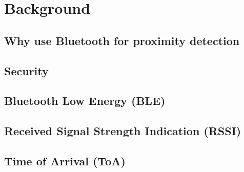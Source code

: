 \section{Background}

\subsection{Why use Bluetooth for proximity detection}

\subsection{Security}

\subsection{Bluetooth Low Energy (BLE)}

\subsection{Received Signal Strength Indication (RSSI)}

\subsection{Time of Arrival (ToA)}

